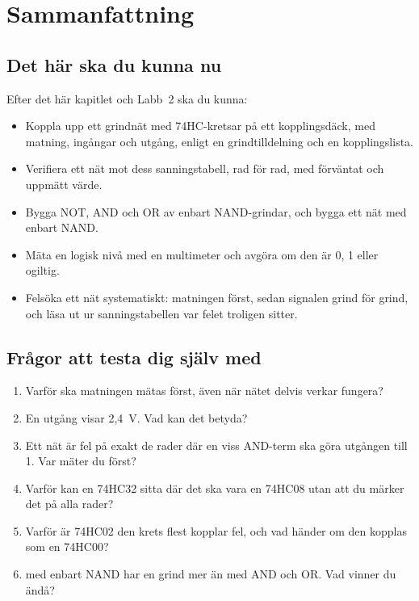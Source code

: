 
\section{Sammanfattning}
\label{c5:sec:summary}

\subsection*{Det här ska du kunna nu}
Efter det här kapitlet och Labb~2 ska du kunna:
\begin{itemize}
  \item Koppla upp ett grindnät med 74HC-kretsar på ett kopplingsdäck, med matning, ingångar och
    utgång, enligt en grindtilldelning och en kopplingslista.
  \item Verifiera ett nät mot dess sanningstabell, rad för rad, med förväntat och uppmätt värde.
  \item Bygga NOT, AND och OR av enbart NAND-grindar, och bygga ett nät med enbart NAND.
  \item Mäta en logisk nivå med en multimeter och avgöra om den är 0, 1 eller ogiltig.
  \item Felsöka ett nät systematiskt: matningen först, sedan signalen grind för grind, och läsa ut
    ur sanningstabellen var felet troligen sitter.
\end{itemize}

\subsection*{Frågor att testa dig själv med}
\begin{enumerate}
  \item Varför ska matningen mätas först, även när nätet delvis verkar fungera?
  \item En utgång visar 2,4~V. Vad kan det betyda?
  \item Ett nät är fel på exakt de rader där en viss AND-term ska göra utgången till 1. Var mäter
    du först?
  \item Varför kan en 74HC32 sitta där det ska vara en 74HC08 utan att du märker det på alla rader?
  \item Varför är 74HC02 den krets flest kopplar fel, och vad händer om den kopplas som en 74HC00?
  \item {} med enbart NAND har en grind mer än med AND och OR. Vad vinner du ändå?
\end{enumerate}

